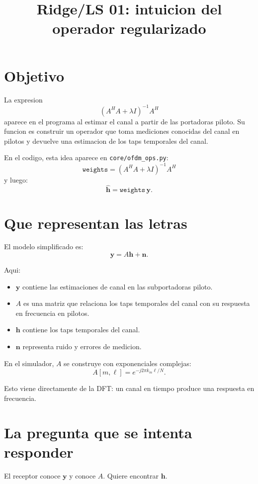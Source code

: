 \documentclass[11pt]{article}
\title{Ridge/LS 01: intuicion del operador regularizado}
\author{}
\date{}
\begin{document}
\maketitle

\section{Objetivo}

La expresion
\[
    (A^H A + \lambda I)^{-1}A^H
\]
aparece en el programa al estimar el canal a partir de las portadoras piloto.
Su funcion es construir un operador que toma mediciones conocidas del canal en
pilotos y devuelve una estimacion de los taps temporales del canal.

En el codigo, esta idea aparece en \texttt{core/ofdm\_ops.py}:
\[
    \texttt{weights}
    =
    (A^H A + \lambda I)^{-1}A^H
\]
y luego:
\[
    \hat{\bm h} = \texttt{weights}\,\bm y.
\]

\section{Que representan las letras}

El modelo simplificado es:
\[
    \bm y = A\bm h + \bm n.
\]

Aqui:

\begin{itemize}
    \item \(\bm y\) contiene las estimaciones de canal en las subportadoras piloto.
    \item \(A\) es una matriz que relaciona los taps temporales del canal con su respuesta en frecuencia en pilotos.
    \item \(\bm h\) contiene los taps temporales del canal.
    \item \(\bm n\) representa ruido y errores de medicion.
\end{itemize}

En el simulador, \(A\) se construye con exponenciales complejas:
\[
    A[m,\ell] = e^{-j2\pi k_m \ell/N}.
\]

Esto viene directamente de la DFT: un canal en tiempo produce una respuesta en
frecuencia.

\section{La pregunta que se intenta responder}

El receptor conoce \(\bm y\) y conoce \(A\). Quiere encontrar \(\bm h\).
\end{document}
